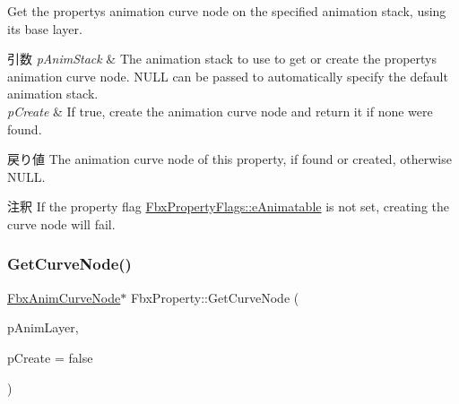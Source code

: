 Get the property\textquotesingle{}s animation curve node on the specified animation stack, using its base layer. 
\begin{DoxyParams}{引数}
{\em p\+Anim\+Stack} & The animation stack to use to get or create the property\textquotesingle{}s animation curve node. {\ttfamily N\+U\+LL} can be passed to automatically specify the default animation stack. \\
\hline
{\em p\+Create} & If {\ttfamily true}, create the animation curve node and return it if none were found. \\
\hline
\end{DoxyParams}
\begin{DoxyReturn}{戻り値}
The animation curve node of this property, if found or created, otherwise N\+U\+LL. 
\end{DoxyReturn}
\begin{DoxyRemark}{注釈}
If the property flag \hyperlink{class_fbx_property_flags_afabfa7e0949aac8a7dcdf8a141867e99ae2c562a65bb942f3f94631794bc3d257}{Fbx\+Property\+Flags\+::e\+Animatable} is not set, creating the curve node will fail. 
\end{DoxyRemark}
\mbox{\label{class_fbx_property_a26057248b360da2653fa9020d88258ac}} 
\subsubsection{\texorpdfstring{Get\+Curve\+Node()}{GetCurveNode()}\hspace{0.1cm}{\footnotesize\ttfamily [3/3]}}
{\footnotesize\ttfamily \hyperlink{class_fbx_anim_curve_node}{Fbx\+Anim\+Curve\+Node}$\ast$ Fbx\+Property\+::\+Get\+Curve\+Node (\begin{DoxyParamCaption}\item[{\hyperlink{class_fbx_anim_layer}{Fbx\+Anim\+Layer} $\ast$}]{p\+Anim\+Layer,  }\item[{bool}]{p\+Create = {\ttfamily false} }\end{DoxyParamCaption})}


